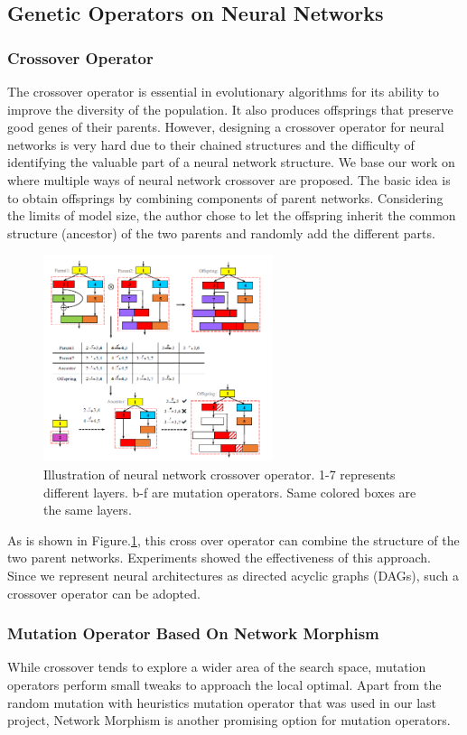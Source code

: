 \documentclass{article}
\begin{document}
\begin{normalsize}
   
   \subsection{Genetic Operators on Neural Networks}
   \subsubsection{Crossover Operator}
   The crossover operator is essential in evolutionary algorithms for its ability to improve the diversity of the population. It also produces offsprings that preserve good genes of their parents. However, designing a crossover operator for neural networks is very hard due to their chained structures and the difficulty of identifying the valuable part of a neural network structure. 
   We base our work on\cite{zhu2019eena} where multiple ways of neural network crossover are proposed. The basic idea is to obtain offsprings by combining components of parent networks. Considering the limits of model size, the author chose to let the offspring inherit the common structure (ancestor) of the two parents and randomly add the different parts.  
   \begin{figure}[H]
      \centering
      \includegraphics[width=0.6\textwidth]{figures/crossover.png}
    \caption{Illustration of neural network crossover operator\cite{zhu2019eena}. 1-7 represents different layers. b-f are mutation operators. Same colored boxes are the same layers.}
    \label{crsov}
   \end{figure}

   As is shown in Figure.\ref{crsov}, this cross over operator can combine the structure of the two parent networks. Experiments showed the effectiveness of this approach. Since we represent neural architectures as directed acyclic graphs (DAGs), such a crossover operator can be adopted.
   \subsubsection{Mutation Operator Based On Network Morphism}
   While crossover tends to explore a wider area of the search space, mutation operators perform small tweaks to approach the local optimal. Apart from the random mutation with heuristics mutation operator that was used in our last project, Network Morphism\cite{wei2016network} is another promising option for mutation operators.


\end{normalsize}
\end{document}
